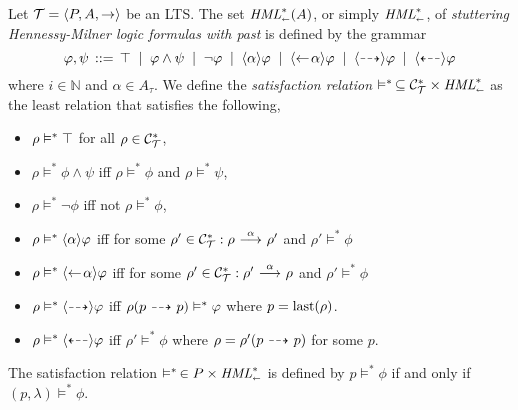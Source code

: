 \begin{definition}
    \label{dfn:hmlpast}
    Let $\mathcal{T}=\langle P,A,\rightarrow \rangle$ be an LTS. The set $\textit{HML}_\shortleftarrow^*(A)$,
    or simply $\textit{HML}_\shortleftarrow^*$, of
    \emph{stuttering Hennessy-Milner logic formulas with past}
    is defined by the grammar
    \[
        \varphi,\psi \,::=\, \top \;\;|\;\; \varphi\land\psi
                                \;\;|\;\; \neg\varphi
                                \;\;|\;\; \mbox{\ensuremath{\langle \alpha \rangle}} \varphi
                                \;\;|\;\; \mbox{\ensuremath{\langle\leftarrow\! \alpha \rangle}} \varphi
                                \;\;|\;\; \mbox{\ensuremath{\langle\stackrel{_{}}{\dashrightarrow}\rangle}} \varphi
                                \;\;|\;\; \mbox{\ensuremath{\langle\stackrel{_{}}{\dashleftarrow}\rangle}} \varphi
    \]
    where $i\in\mathbb{N}$ and $\alpha\in A_\tau$.
    We define the \emph{satisfaction relation} $\vDash^*\,\subseteq \mathcal{C}_{\mathcal{T}}^* \times \textit{HML}_\shortleftarrow^*$
    as the least relation that satisfies the following,
    \begin{itemize}
        \item $\rho\vDash^*\top$ for all $\rho\in\mathcal{C}_{\mathcal{T}}^*$,
        \item $\rho\vDash^*\phi\land\psi$ iff $\rho\vDash^*\phi$ and $\rho\vDash^*\psi$,
        \item $\rho\vDash^*\neg\phi$ iff not $\rho\vDash^*\phi$,
        \item $\rho\vDash^*\mbox{\ensuremath{\langle \alpha \rangle}}\varphi$ iff for some
              $\rho'\in\mathcal{C}_{\mathcal{T}}^* : \rho\ {\stackrel{{\alpha}}{\longrightarrow}}\ \rho'$ and $\rho'\vDash^*\phi$
        \item $\rho\vDash^*\mbox{\ensuremath{\langle\leftarrow\! \alpha \rangle}}\varphi$ iff for some
              $\rho'\in\mathcal{C}_{\mathcal{T}}^* : \rho'\ {\stackrel{{\alpha}}{\longrightarrow}}\ \rho$ and $\rho'\vDash^*\phi$
        \item $\rho\vDash^*\mbox{\ensuremath{\langle\stackrel{_{}}{\dashrightarrow}\rangle}}\varphi$ iff
              $\rho(p\ {\stackrel{_{}}{\dashrightarrow}}\  p) \vDash^* \varphi$ where $p=\operatorname{last}(\rho)$.
        \item $\rho\vDash^*\mbox{\ensuremath{\langle\stackrel{_{}}{\dashleftarrow}\rangle}}\varphi$ iff
              $\rho' \vDash^* \phi$ where $\rho = \rho'(p \ {\stackrel{_{}}{\dashrightarrow}}\  p)$ for some $p$.
    \end{itemize}
    The satisfaction relation $\vDash^*\,\in P\times\textit{HML}_\shortleftarrow^*$ is defined by
    $p\vDash^*\phi$ if and only if $(p,\lambda)\vDash^* \phi$.
\end{definition}

